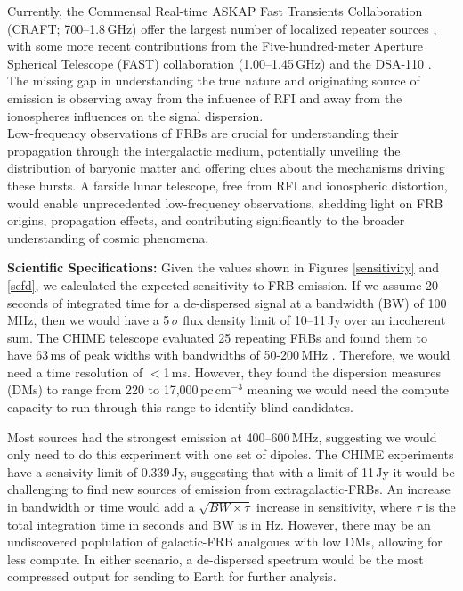 Currently, the Commensal Real-time ASKAP Fast Transients Collaboration (CRAFT; 700--1.8\,GHz) offer the largest number of localized repeater sources \citep{SM_2023}, with some more recent contributions from the Five-hundred-meter Aperture Spherical Telescope (FAST) collaboration (1.00--1.45\,GHz\citep{ZX_2023}) and the DSA-110 \citep{SD_2023,LC_2023}. The missing gap in understanding the true nature and originating source of emission is observing away from the influence of RFI and away from the ionospheres influences on the signal dispersion. \\ 

Low-frequency observations of FRBs are crucial for understanding their propagation through the intergalactic medium, potentially unveiling the distribution of baryonic matter and offering clues about the mechanisms driving these bursts. A farside lunar telescope, free from RFI and ionospheric distortion, would enable unprecedented low-frequency observations, shedding light on FRB origins, propagation effects, and contributing significantly to the broader understanding of cosmic phenomena.

\textbf{Scientific Specifications:} Given the values shown in Figures \ref{sensitivity} and \ref{sefd}, we calculated the expected sensitivity to FRB emission. If we assume 20\,seconds of integrated time for a de-dispersed signal at a bandwidth (BW) of 100\,MHz, then we would have a 5\,$\sigma$ flux density limit of 10--11\,Jy over an incoherent sum. The CHIME telescope evaluated 25 repeating FRBs and found them to have 63\,ms of peak widths with bandwidths of 50-200\,MHz \citep{CHIME_RepeatingFRB}. Therefore, we would need a time resolution of $<$1\,ms. However, they found the dispersion measures (DMs) to range from 220 to 17,000\,pc\,cm$^{-3}$ meaning we would need the compute capacity to run through this range to identify blind candidates. 

Most sources had the strongest emission at 400--600\,MHz, suggesting we would only need to do this experiment with one set of dipoles. The CHIME experiments have a sensivity limit of 0.339\,Jy, suggesting that with a limit of 11\,Jy it would be challenging to find new sources of emission from extragalactic-FRBs. An increase in bandwidth or time would add a $\sqrt{BW\times\tau}$ increase in sensitivity, where $\tau$ is the total integration time in seconds and BW is in Hz. However, there may be an undiscovered poplulation of galactic-FRB analgoues with low DMs, allowing for less compute. In either scenario, a de-dispersed spectrum would be the most compressed output for sending to Earth for further analysis.

